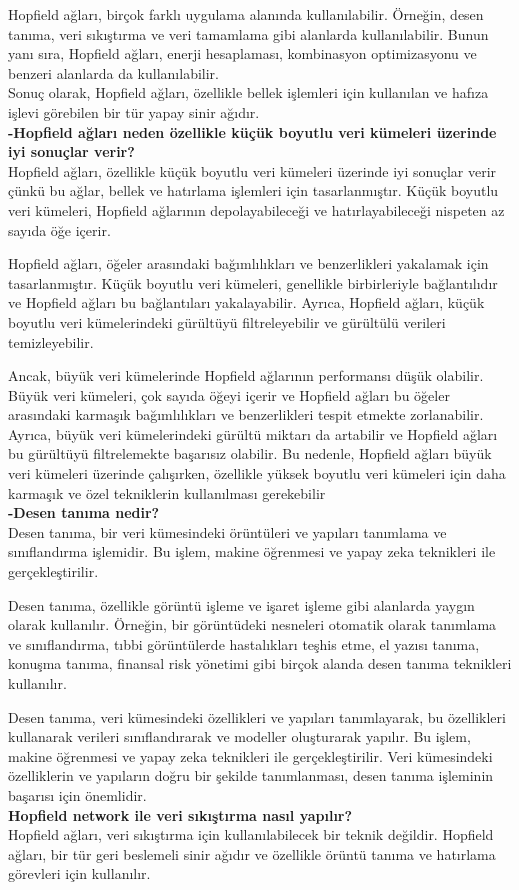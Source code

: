 \documentclass[11pt]{article}
\begin{document}
Hopfield ağları, birçok farklı uygulama alanında kullanılabilir. Örneğin, desen tanıma, veri sıkıştırma ve veri tamamlama gibi alanlarda kullanılabilir. Bunun yanı sıra, Hopfield ağları, enerji hesaplaması, kombinasyon optimizasyonu ve benzeri alanlarda da kullanılabilir.\\
Sonuç olarak, Hopfield ağları, özellikle bellek işlemleri için kullanılan ve hafıza işlevi görebilen bir tür yapay sinir ağıdır.\\
\textbf{-Hopfield ağları neden özellikle küçük boyutlu veri kümeleri üzerinde iyi sonuçlar verir?}\\
Hopfield ağları, özellikle küçük boyutlu veri kümeleri üzerinde iyi sonuçlar verir çünkü bu ağlar, bellek ve hatırlama işlemleri için tasarlanmıştır. Küçük boyutlu veri kümeleri, Hopfield ağlarının depolayabileceği ve hatırlayabileceği nispeten az sayıda öğe içerir.

Hopfield ağları, öğeler arasındaki bağımlılıkları ve benzerlikleri yakalamak için tasarlanmıştır. Küçük boyutlu veri kümeleri, genellikle birbirleriyle bağlantılıdır ve Hopfield ağları bu bağlantıları yakalayabilir. Ayrıca, Hopfield ağları, küçük boyutlu veri kümelerindeki gürültüyü filtreleyebilir ve gürültülü verileri temizleyebilir.

Ancak, büyük veri kümelerinde Hopfield ağlarının performansı düşük olabilir. Büyük veri kümeleri, çok sayıda öğeyi içerir ve Hopfield ağları bu öğeler arasındaki karmaşık bağımlılıkları ve benzerlikleri tespit etmekte zorlanabilir. Ayrıca, büyük veri kümelerindeki gürültü miktarı da artabilir ve Hopfield ağları bu gürültüyü filtrelemekte başarısız olabilir. Bu nedenle, Hopfield ağları büyük veri kümeleri üzerinde çalışırken, özellikle yüksek boyutlu veri kümeleri için daha karmaşık ve özel tekniklerin kullanılması gerekebilir\\

\textbf{-Desen tanıma nedir?}\\
Desen tanıma, bir veri kümesindeki örüntüleri ve yapıları tanımlama ve sınıflandırma işlemidir. Bu işlem, makine öğrenmesi ve yapay zeka teknikleri ile gerçekleştirilir.

Desen tanıma, özellikle görüntü işleme ve işaret işleme gibi alanlarda yaygın olarak kullanılır. Örneğin, bir görüntüdeki nesneleri otomatik olarak tanımlama ve sınıflandırma, tıbbi görüntülerde hastalıkları teşhis etme, el yazısı tanıma, konuşma tanıma, finansal risk yönetimi gibi birçok alanda desen tanıma teknikleri kullanılır.

Desen tanıma, veri kümesindeki özellikleri ve yapıları tanımlayarak, bu özellikleri kullanarak verileri sınıflandırarak ve modeller oluşturarak yapılır. Bu işlem, makine öğrenmesi ve yapay zeka teknikleri ile gerçekleştirilir. Veri kümesindeki özelliklerin ve yapıların doğru bir şekilde tanımlanması, desen tanıma işleminin başarısı için önemlidir.\\
\textbf{Hopfield network ile veri sıkıştırma nasıl yapılır?}\\
Hopfield ağları, veri sıkıştırma için kullanılabilecek bir teknik değildir. Hopfield ağları, bir tür geri beslemeli sinir ağıdır ve özellikle örüntü tanıma ve hatırlama görevleri için kullanılır.
\end{document}
